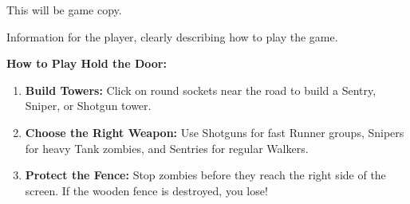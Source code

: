 \begin{guidance}
This will be game copy.

Information for the player, clearly describing how to play the game.
\end{guidance}
\textbf{How to Play Hold the Door:}
\begin{enumerate}
  \item \textbf{Build Towers:} Click on round sockets near the road to build a Sentry, Sniper, or Shotgun tower.
  \item \textbf{Choose the Right Weapon:} Use Shotguns for fast Runner groups, Snipers for heavy Tank zombies, and Sentries for regular Walkers.
  \item \textbf{Protect the Fence:} Stop zombies before they reach the right side of the screen. If the wooden fence is destroyed, you lose!
\end{enumerate}
